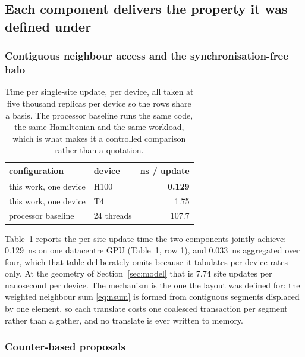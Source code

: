 \documentclass[11pt,a4paper]{article}
\begin{document}
\subsection{Each component delivers the property it was defined under}

\subsubsection{Contiguous neighbour access and the synchronisation-free halo}

\begin{table}[htbp]
\centering
\caption{Time per single-site update, per device, all taken at five thousand
replicas per device so the rows share a basis. The processor baseline runs the
same code, the same Hamiltonian and the same workload, which is what makes it a
controlled comparison rather than a quotation.}
\label{tab:rate}
\begin{tabular}{llr}
\toprule
configuration & device & {ns / update} \\
\midrule
this work, one device   & H100       & \textbf{0.129} \\
this work, one device   & T4         & 1.75 \\
processor baseline      & 24 threads & 107.7 \\
\bottomrule
\end{tabular}
\end{table}

Table~\ref{tab:rate} reports the per-site update time the two components
jointly achieve: \SI{0.129}{\nano\second} on one datacentre GPU
(Table~\ref{tab:rate}, row 1), and \SI{0.033}{\nano\second} aggregated over
four, which that table deliberately omits because it tabulates per-device rates
only. At the geometry of Section~\ref{sec:model} that is $7.74$ site updates per
nanosecond per device. The mechanism is the one the layout was defined for: the
weighted neighbour sum \eqref{eq:nsum} is formed from contiguous segments
displaced by one element, so each translate costs one coalesced transaction per
segment rather than a gather, and no translate is ever written to memory.

\subsubsection{Counter-based proposals}
\end{document}
